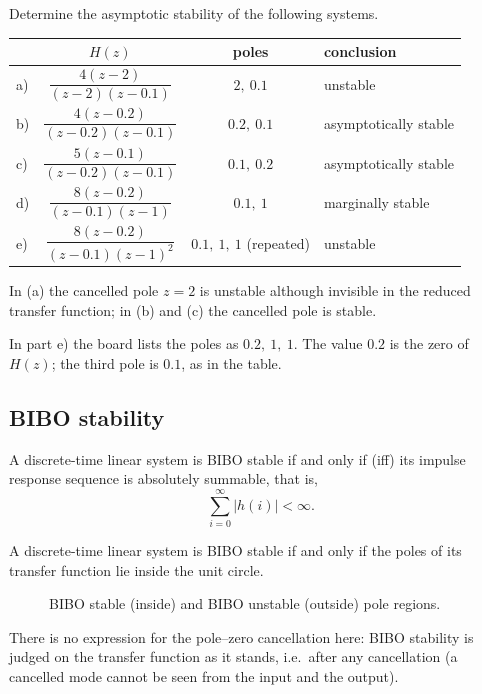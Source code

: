 \begin{example}
Determine the asymptotic stability of the following systems.
\begin{center}
\renewcommand{\arraystretch}{1.7}
\begin{tabular}{@{}l c c l@{}}
 & $H(z)$ & poles & conclusion\\\hline
a) & $\dfrac{4(z-2)}{(z-2)(z-0.1)}$ & $2,\ 0.1$ & unstable\\
b) & $\dfrac{4(z-0.2)}{(z-0.2)(z-0.1)}$ & $0.2,\ 0.1$ & asymptotically stable\\
c) & $\dfrac{5(z-0.1)}{(z-0.2)(z-0.1)}$ & $0.1,\ 0.2$ & asymptotically stable\\
d) & $\dfrac{8(z-0.2)}{(z-0.1)(z-1)}$ & $0.1,\ 1$ & marginally stable\\
e) & $\dfrac{8(z-0.2)}{(z-0.1)(z-1)^{2}}$ & $0.1,\ 1,\ 1$ (repeated) & unstable
\end{tabular}
\end{center}
In (a) the cancelled pole $z=2$ is unstable although invisible in the reduced transfer function; in (b) and
(c) the cancelled pole is stable.
\end{example}

\begin{boardnote}
In part e) the board lists the poles as $0.2,\ 1,\ 1$. The value $0.2$ is the zero of $H(z)$; the third pole
is $0.1$, as in the table.
\end{boardnote}

\subsection{BIBO stability}
\begin{theorem}
A discrete-time linear system is BIBO stable if and only if (iff) its impulse response sequence is
absolutely summable, that is,
\[
  \sum_{i=0}^{\infty}|h(i)|<\infty.
\]
\end{theorem}
A discrete-time linear system is BIBO stable if and only if the poles of its transfer function lie inside
the unit circle.

\begin{figure}[ht]
\centering
\resizebox{0.4\linewidth}{!}{\figBiboRegions}
\caption{BIBO stable (inside) and BIBO unstable (outside) pole regions.}
\end{figure}

There is no expression for the pole--zero cancellation here: BIBO stability is judged on the transfer
function as it stands, i.e.\ after any cancellation (a cancelled mode cannot be seen from the input and
the output).

